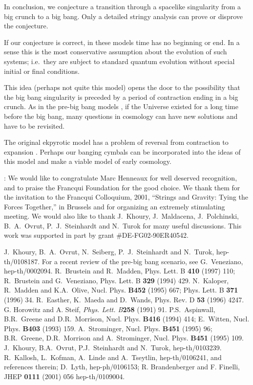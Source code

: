 \documentclass[a4paper,12pt,oneside]{article}
\begin{document}
In conclusion, we conjecture a transition through a spacelike
singularity from a big crunch to a big bang. Only a detailed
stringy analysis can prove or disprove the conjecture.

If our conjecture is correct, in these models time has no
beginning or end.  In a sense this is the most conservative
assumption about the evolution of such systems; i.e.\ they are
subject to standard quantum evolution without special initial or
final conditions.

This idea (perhaps not quite this model) opens the door to the
possibility that the big bang singularity is preceded by a period
of contraction ending in a big crunch.  As in the pre-big bang
models \cite{PBB}, if the Universe existed for a long time before
the big bang, many questions in cosmology can have new solutions
and have to be revisited.

The original ekpyrotic model \cite{KOST} has a problem of
reversal from contraction to expansion \cite{linde}.  Perhaps our
banging cymbals can be incorporated into the ideas of this model
and make a viable model of early cosmology.

\vspace{5mm}

: We would like to congratulate
Marc Henneaux for well deserved recognition, and to praise the
Francqui Foundation for the good choice.  We thank them for the
invitation to the Francqui Colloquium, 2001, ``Strings and
Gravity: Tying the Forces Together,'' in Brussels and for
organizing an extremely stimulating meeting. We would also like
to thank J.~Khoury, J.~Maldacena, J.~Polchinski, B.~A.~Ovrut,
P.~J.~Steinhardt and N.~Turok for many useful discussions. This
work was supported in part by grant \#DE-FG02-90ER40542.

\vspace{5mm}


\begin{thebibliography}{99}
 J.~Khoury, B.~A.~Ovrut, N.~Seiberg,
P.~J.~Steinhardt and N.~Turok, hep-th/0108187.
 For a recent review of the pre-big bang scenario,
see G.~Veneziano, hep-th/0002094.
 R.~Brustein and R.~Madden,
Phys. Lett. B {\bf 410} (1997) 110; R.~Brustein and G.~Veneziano,
Phys. Lett. B {\bf 329} (1994) 429. N.~Kaloper, R.~Madden and
K.A.~Olive, Nucl. Phys. {\bf B452} (1995) 667; Phys. Lett. B {\bf
371} (1996) 34.  R.~Easther, K.~Maeda and D.~Wands, Phys. Rev. D
{\bf 53} (1996) 4247.
 G. Horowitz and A. Steif, {\it Phys. Lett. B}{\bf 258}
(1991) 91.
 P.S.~Aspinwall, B.R.~Greene and D.R.~Morrison,
Nucl. Phys. {\bf B416} (1994) 414; E.~Witten, Nucl. Phys. {\bf
B403} (1993) 159.
 A.~Strominger, Nucl. Phys. {\bf B451} (1995) 96;
B.R.~Greene, D.R.~Morrison and A.~Strominger, Nucl. Phys. {\bf
B451} (1995) 109.
 J.~Khoury, B.A.~Ovrut,
P.J.~Steinhardt and N.~Turok, hep-th/0103239.
 R.~Kallosh, L.~Kofman, A.~Linde and A.~Tseytlin,
hep-th/0106241, and references therein; D.~Lyth, hep-ph/0106153;
R. Brandenberger and F. Finelli, JHEP {\bf 0111} (2001) 056
hep-th/0109004.

\end{thebibliography}
\end{document}
